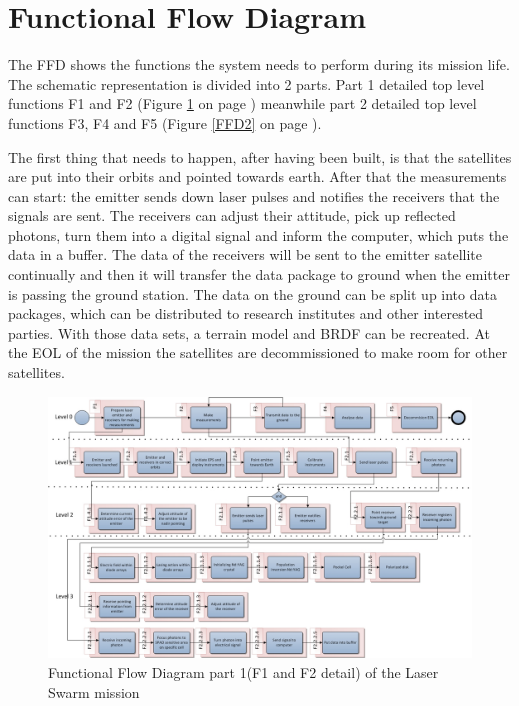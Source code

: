 \section{Functional Flow Diagram}
\label{section_FFD}
The \ac{FFD} shows the functions the system needs to perform during its mission life. The schematic representation is divided into 2 parts. Part 1 detailed top level functions F1 and F2 (Figure \ref{FFD1} on page \pageref{FFD1}) meanwhile part 2 detailed top level functions F3, F4 and F5 (Figure \ref{FFD2} on page \pageref{FFD2}).

The first thing that needs to happen, after having been built, is that the satellites are put into their orbits and pointed towards earth. After that the measurements can start: the emitter sends down laser pulses and notifies the receivers that the signals are sent. The receivers can adjust their attitude, pick up reflected photons, turn them into a digital signal and inform the computer, which puts the data in a buffer. The data of the receivers will be sent to the emitter satellite continually and then it will transfer the data package to ground when the emitter is passing the ground station. The data on the ground can be split up into data packages, which can be distributed to research institutes and other interested parties. With those data sets, a terrain model and \ac{BRDF} can be recreated. At the \ac{EOL} of the mission the satellites are decommissioned to make room for other satellites.

\begin{landscape}
\begin{figure}[ht!]
\centering
\includegraphics[width=1.3\textheight]{chapters/img/FFD1.jpg}
\caption{Functional Flow Diagram part 1(F1 and F2 detail) of the Laser Swarm mission}
\label{FFD1}
\end{figure}
\end{landscape}

